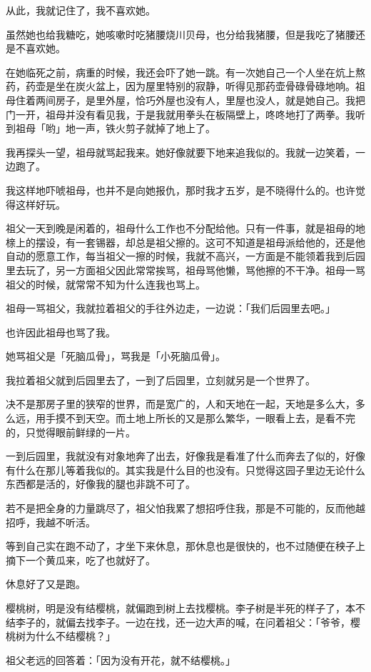 \documentclass[UTF8]{ctexart}
\begin{document}
从此，我就记住了，我不喜欢她。

虽然她也给我糖吃，她咳嗽时吃猪腰烧川贝母，也分给我猪腰，但是我吃了猪腰还是不喜欢她。

在她临死之前，病重的时候，我还会吓了她一跳。有一次她自己一个人坐在炕上熬药，药壶是坐在炭火盆上，因为屋里特别的寂静，听得见那药壶骨碌骨碌地响。祖母住着两间房子，是里外屋，恰巧外屋也没有人，里屋也没人，就是她自己。我把门一开，祖母并没有看见我，于是我就用拳头在板隔壁上，咚咚地打了两拳。我听到祖母「哟」地一声，铁火剪子就掉了地上了。

我再探头一望，祖母就骂起我来。她好像就要下地来追我似的。我就一边笑着，一边跑了。

我这样地吓唬祖母，也并不是向她报仇，那时我才五岁，是不晓得什么的。也许觉得这样好玩。

祖父一天到晚是闲着的，祖母什么工作也不分配给他。只有一件事，就是祖母的地榇上的摆设，有一套锡器，却总是祖父擦的。这可不知道是祖母派给他的，还是他自动的愿意工作，每当祖父一擦的时候，我就不高兴，一方面是不能领着我到后园里去玩了，另一方面祖父因此常常挨骂，祖母骂他懒，骂他擦的不干净。祖母一骂祖父的时候，就常常不知为什么连我也骂上。

祖母一骂祖父，我就拉着祖父的手往外边走，一边说：「我们后园里去吧。」

也许因此祖母也骂了我。

她骂祖父是「死脑瓜骨」，骂我是「小死脑瓜骨」。

我拉着祖父就到后园里去了，一到了后园里，立刻就另是一个世界了。

决不是那房子里的狭窄的世界，而是宽广的，人和天地在一起，天地是多么大，多么远，用手摸不到天空。而土地上所长的又是那么繁华，一眼看上去，是看不完的，只觉得眼前鲜绿的一片。

一到后园里，我就没有对象地奔了出去，好像我是看准了什么而奔去了似的，好像有什么在那儿等着我似的。其实我是什么目的也没有。只觉得这园子里边无论什么东西都是活的，好像我的腿也非跳不可了。

若不是把全身的力量跳尽了，祖父怕我累了想招呼住我，那是不可能的，反而他越招呼，我越不听活。

等到自己实在跑不动了，才坐下来休息，那休息也是很快的，也不过随便在秧子上摘下一个黄瓜来，吃了也就好了。

休息好了又是跑。

樱桃树，明是没有结樱桃，就偏跑到树上去找樱桃。李子树是半死的样子了，本不结李子的，就偏去找李子。一边在找，还一边大声的喊，在问着祖父：「爷爷，樱桃树为什么不结樱桃？」

祖父老远的回答着：「因为没有开花，就不结樱桃。」
\end{document}
